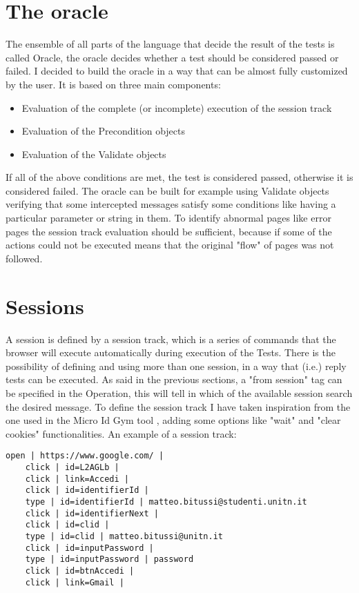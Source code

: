 \section{The oracle}
The ensemble of all parts of the language that decide the result of the tests is called Oracle,
the oracle decides whether a test should be considered passed or failed. I decided to build the oracle in a way that can be almost fully customized by the user. It is based on three main components:
\begin{itemize}
    \item Evaluation of the complete (or incomplete) execution of the session track 
    \item Evaluation of the Precondition objects
    \item Evaluation of the Validate objects
\end{itemize}
If all of the above conditions are met, the test is considered passed, otherwise it is considered failed.
The oracle can be built for example using Validate objects verifying that some intercepted messages satisfy some conditions like having a particular parameter or string in them.
To identify abnormal pages like error pages the session track evaluation should be sufficient, because if some of the actions could not be executed means that the original "flow" of pages was not followed.

\section{Sessions}
A session is defined by a session track, which is a series of commands that the browser will execute automatically during execution of the Tests. There is the possibility of defining and using more than one session, in a way that (i.e.) reply tests can be executed.
As said in the previous sections, a "from session" tag can be specified in the Operation, this will tell in which of the available session search the desired message. To define the session track I have taken inspiration from the one used in the Micro Id Gym tool \cite{claudio_grisenti}\cite{stefano_faccini}, adding some options like "wait" and "clear cookies" functionalities.
An example of a session track:

\begin{lstlisting}[]
    open | https://www.google.com/ |
    click | id=L2AGLb |
    click | link=Accedi |
    click | id=identifierId |
    type | id=identifierId | matteo.bitussi@studenti.unitn.it
    click | id=identifierNext |
    click | id=clid |
    type | id=clid | matteo.bitussi@unitn.it
    click | id=inputPassword |
    type | id=inputPassword | password
    click | id=btnAccedi |
    click | link=Gmail |
\end{lstlisting}

